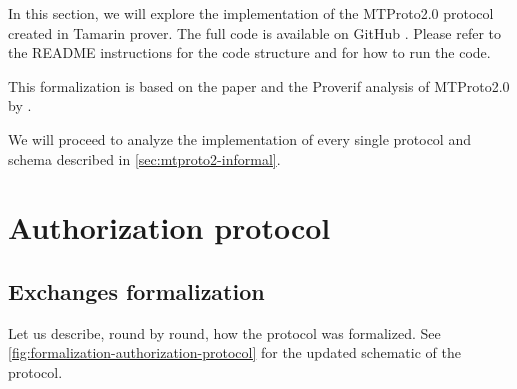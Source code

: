 In this section, we will explore the implementation of the MTProto2.0 protocol created in Tamarin prover. The full code is available on GitHub \cite{MTProto2-Tamarin}. Please refer to the README instructions for the code structure and for how to run the code.

This formalization is based on the paper \cite{MTProto2-Proverif} and the Proverif analysis \cite{MTProto2-Proverif-impl} of MTProto2.0 by \MMNV{}.

We will proceed to analyze the implementation of every single protocol and schema described in \cref{sec:mtproto2-informal}.

\section{Authorization protocol}
\label{sec:auth-prot-formalization}
\subsection{Exchanges formalization}
Let us describe, round by round, how the protocol was formalized. See \cref{fig:formalization-authorization-protocol} for the updated schematic of the protocol.


